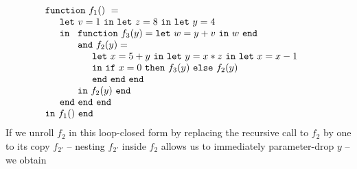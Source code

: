 \begin{equation}
\label{FunctionalConstructionProgram8}
\begin{array}{l}
\mathtt{function}\ f_1()\ = \\
  \quad
  \begin{array}{l}
     \mathtt{let}\ v = 1 \ 
     \mathtt{in\ let}\ z = 8 \ 
     \mathtt{in\ let}\ y = 4\\
     \mathtt{in}\ 
     \begin{array}[t]{l}
       \mathtt{function}\ f_3(y) = 
          \mathtt{let}\ w = y+v\ \mathtt{in}\ w\ \mathtt{end}\\
       \mathtt{and}\ f_2(y) =\\
         \quad
         \begin{array}{l}
           \mathtt{let}\ x = 5+y\
           \mathtt{in\ let}\ y = x*z\
           \mathtt{in\ let}\ x = x-1\\
           \mathtt{in}\
             \mathtt{if}\ x=0\
             \mathtt{then}\ f_3(y)\ 
             \mathtt{else}\ f_2(y)\\
           \mathtt{end\ end\ end}
         \end{array}\\
     \mathtt{in}\ f_2(y)\ \mathtt{end}
     \end{array}\\
     \mathtt{end\ end\ end}\\
   \end{array}\\
\mathtt{in}\ f_1()\  \mathtt{end}
\end{array}
\end{equation}
If we unroll $f_2$ in this loop-closed form by replacing the recursive
call to $f_2$ by one to its copy $f_{2'}$ -- nesting $f_{2'}$ inside $f_2$
allows us to immediately parameter-drop $y$ -- we obtain
